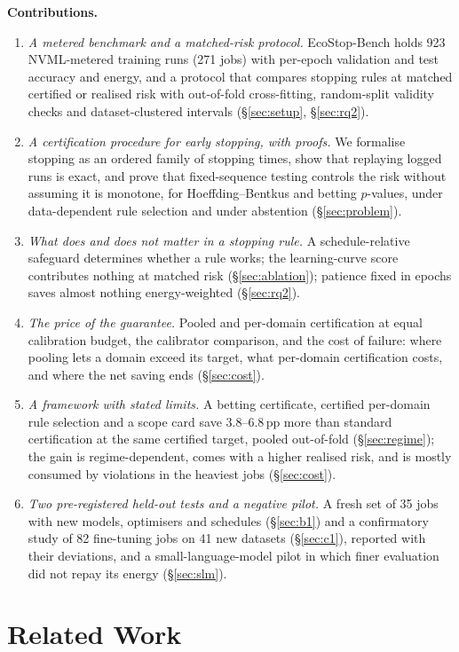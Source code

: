 \documentclass[3p,twocolumn,10pt]{elsarticle}
\theoremstyle{definition}
\begin{document}
\textbf{Contributions.}
\begin{enumerate}
\item \emph{A metered benchmark and a matched-risk protocol.} EcoStop-Bench holds 923 NVML-metered training runs (271 jobs) with per-epoch validation and test accuracy and energy, and a protocol that compares stopping rules at matched certified or realised risk with out-of-fold cross-fitting, random-split validity checks and dataset-clustered intervals (\S\ref{sec:setup}, \S\ref{sec:rq2}).
\item \emph{A certification procedure for early stopping, with proofs.} We formalise stopping as an ordered family of stopping times, show that replaying logged runs is exact, and prove that fixed-sequence testing controls the risk without assuming it is monotone, for Hoeffding--Bentkus and betting $p$-values, under data-dependent rule selection and under abstention (\S\ref{sec:problem}).
\item \emph{What does and does not matter in a stopping rule.} A schedule-relative safeguard determines whether a rule works; the learning-curve score contributes nothing at matched risk (\S\ref{sec:ablation}); patience fixed in epochs saves almost nothing energy-weighted (\S\ref{sec:rq2}).
\item \emph{The price of the guarantee.} Pooled and per-domain certification at equal calibration budget, the calibrator comparison, and the cost of failure: where pooling lets a domain exceed its target, what per-domain certification costs, and where the net saving ends (\S\ref{sec:cost}).
\item \emph{A framework with stated limits.} A betting certificate, certified per-domain rule selection and a scope card save 3.8--6.8\,pp more than standard certification at the same certified target, pooled out-of-fold (\S\ref{sec:regime}); the gain is regime-dependent, comes with a higher realised risk, and is mostly consumed by violations in the heaviest jobs (\S\ref{sec:cost}).
\item \emph{Two pre-registered held-out tests and a negative pilot.} A fresh set of 35 jobs with new models, optimisers and schedules (\S\ref{sec:b1}) and a confirmatory study of 82 fine-tuning jobs on 41 new datasets (\S\ref{sec:c1}), reported with their deviations, and a small-language-model pilot in which finer evaluation did not repay its energy (\S\ref{sec:slm}).
\end{enumerate}

\section{Related Work}
\label{sec:related}
\end{document}
